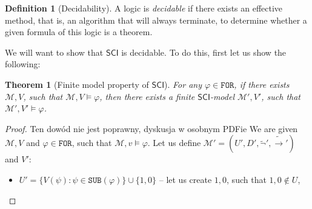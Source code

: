 \documentclass{article}
\newtheorem{theorem}{Theorem}
\theoremstyle{definition}
\newtheorem{definition}{Definition}[section]
\theoremstyle{definition}
\theoremstyle{definition}
\theoremstyle{definition}
\theoremstyle{definition}
\newcommand*{\ra}{\rightarrow}
\newcommand*{\FOR}{\texttt{FOR}}
\newcommand*{\SUB}{\texttt{SUB}}
\newcommand{\SCI}{$\mathsf{SCI}$\xspace}
\begin{document}
\begin{definition}[Decidability]
    A logic is \emph{decidable} if there exists an effective method, that is, an algorithm that will always terminate, to determine whether a given formula of this logic is a theorem.
\end{definition}
%
We will want to show that \SCI is decidable. To do this, first let us show the
following:
\begin{theorem}[Finite model property of \SCI]
    \label{finite_model}
    For any $\varphi \in \FOR$, if there exists $\mathcal{M},V$, such that $\mathcal{M},V \models \varphi$, then there exists a finite \SCI-model $\mathcal{M'},V'$, such that $\mathcal{M'},V'\models \varphi$.
\end{theorem}
\begin{proof}
    {\color{red} Ten dowód nie jest poprawny, dyskusja w osobnym PDFie}
    We are given $\mathcal{M}, V$ and $\varphi \in \FOR$, such that $\mathcal{M}, v \models \varphi$. Let us define $\mathcal{M'} = (U', D', \tilde{\lnot}', \tilde{\ra}')$ and $V'$:
    \begin{itemize}
        \item $U' = \{V(\psi) : \psi \in \SUB(\varphi)\} \cup \{1, 0\}$ -- let us create $1, 0$, such that $1, 0 \not \in U$,


\end{itemize}
\end{proof}
\end{document}
